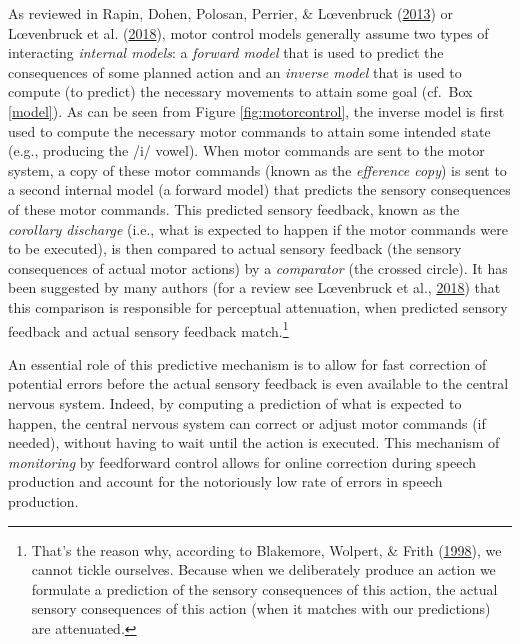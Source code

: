 \documentclass[a4paper,12pt,twoside,onecolumn,openright,final,oldfontcommands]{memoir}
\let\rmarkdownfootnote\footnote%
\def\footnote{\protect\rmarkdownfootnote}
\begin{document}
As reviewed in Rapin, Dohen, Polosan, Perrier, \& Lœvenbruck (\protect\hyperlink{ref-Rapin2013}{2013}) or Lœvenbruck et al. (\protect\hyperlink{ref-loevenbruck_cognitive_2018}{2018}), motor control models generally assume two types of interacting \emph{internal models}: a \emph{forward model} that is used to predict the consequences of some planned action and an \emph{inverse model} that is used to compute (to predict) the necessary movements to attain some goal (cf.~Box \ref{model}). As can be seen from Figure \ref{fig:motorcontrol}, the inverse model is first used to compute the necessary motor commands to attain some intended state (e.g., producing the /i/ vowel). When motor commands are sent to the motor system, a copy of these motor commands (known as the \emph{efference copy}) is sent to a second internal model (a forward model) that predicts the sensory consequences of these motor commands. This predicted sensory feedback, known as the \emph{corollary discharge} (i.e., what is expected to happen if the motor commands were to be executed), is then compared to actual sensory feedback (the sensory consequences of actual motor actions) by a \emph{comparator} (the crossed circle). It has been suggested by many authors (for a review see Lœvenbruck et al., \protect\hyperlink{ref-loevenbruck_cognitive_2018}{2018}) that this comparison is responsible for perceptual attenuation, when predicted sensory feedback and actual sensory feedback match.\footnote{That's the reason why, according to Blakemore, Wolpert, \& Frith (\protect\hyperlink{ref-blakemore_central_1998}{1998}), we cannot tickle ourselves. Because when we deliberately produce an action we formulate a prediction of the sensory consequences of this action, the actual sensory consequences of this action (when it matches with our predictions) are attenuated.}

An essential role of this predictive mechanism is to allow for fast correction of potential errors before the actual sensory feedback is even available to the central nervous system. Indeed, by computing a prediction of what is expected to happen, the central nervous system can correct or adjust motor commands (if needed), without having to wait until the action is executed. This mechanism of \emph{monitoring} by feedforward control allows for online correction during speech production and account for the notoriously low rate of errors in speech production.
\end{document}
